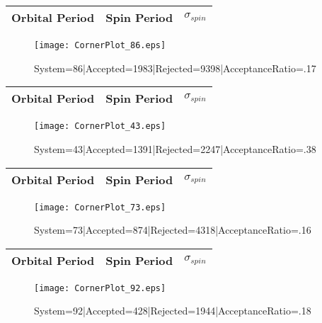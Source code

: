 \documentclass[10pt]{article}
\begin{document}
\begin{center}
        \begin{tabular}{|c|c|c|}
        \hline
Orbital Period & Spin Period & $\sigma_{spin}$ \\
 \hline
        \end{tabular}
        \end{center}
\begin{figure}[h] 
        \texttt{[image: CornerPlot\_86.eps]}
        \caption{System=86|Accepted=1983|Rejected=9398|AcceptanceRatio=.17}
        \label{S86}
        \centering
        \end{figure}
\begin{center}
        \begin{tabular}{|c|c|c|}
        \hline
Orbital Period & Spin Period & $\sigma_{spin}$ \\
 \hline
        \end{tabular}
        \end{center}
\begin{figure}[h] 
        \texttt{[image: CornerPlot\_43.eps]}
        \caption{System=43|Accepted=1391|Rejected=2247|AcceptanceRatio=.38}
        \label{S43}
        \centering
        \end{figure}
\begin{center}
        \begin{tabular}{|c|c|c|}
        \hline
Orbital Period & Spin Period & $\sigma_{spin}$ \\
 \hline
        \end{tabular}
        \end{center}
\begin{figure}[h] 
        \texttt{[image: CornerPlot\_73.eps]}
        \caption{System=73|Accepted=874|Rejected=4318|AcceptanceRatio=.16}
        \label{S73}
        \centering
        \end{figure}
\begin{center}
        \begin{tabular}{|c|c|c|}
        \hline
Orbital Period & Spin Period & $\sigma_{spin}$ \\
 \hline
        \end{tabular}
        \end{center}
\begin{figure}[h] 
        \texttt{[image: CornerPlot\_92.eps]}
        \caption{System=92|Accepted=428|Rejected=1944|AcceptanceRatio=.18}
        \label{S92}
        \centering
        \end{figure}
\end{document}
